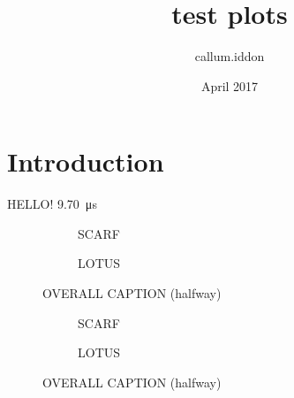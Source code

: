 \documentclass{article}
\title{test plots}
\author{callum.iddon }
\date{April 2017}
\begin{document}
\maketitle

\section{Introduction}

HELLO! \SI{9.70}{\micro\second}

\newlength\figureheight
\newlength\figurewidth
\setlength\figureheight{7cm}
\setlength\figurewidth{\textwidth}


\begin{landscape}
 \begin{figure}[H]
    \centering
    \begin{subfigure}{\textwidth}
      \centering
        
      \caption{SCARF}
    \end{subfigure}

    \begin{subfigure}{\textwidth}
      \centering
        
      \caption{LOTUS}
    \end{subfigure}
    \caption{OVERALL CAPTION (halfway)}
 \end{figure}

 \begin{figure}[H]\ContinuedFloat
    \centering
    \begin{subfigure}{\textwidth}
      \centering
        
      \caption{SCARF}
    \end{subfigure}

    \begin{subfigure}{\textwidth}
      \centering
        
      \caption{LOTUS}
    \end{subfigure}
    \caption{OVERALL CAPTION (halfway)}
 \end{figure}
\end{landscape}
\end{document}
